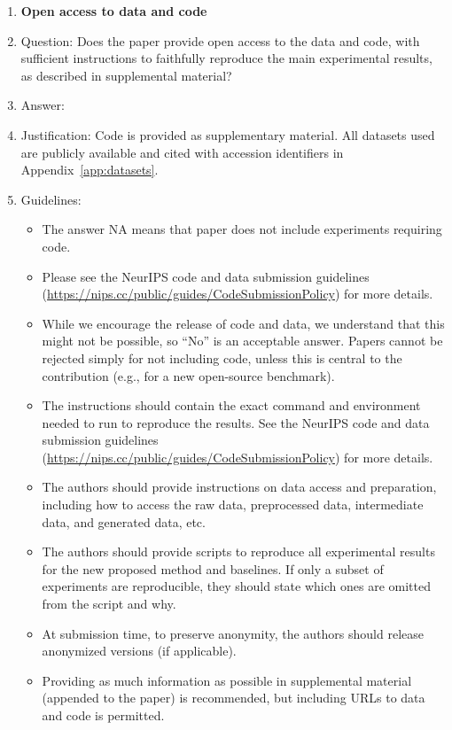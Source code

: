 \documentclass{article}
\theoremstyle{plain}
\theoremstyle{definition}
\begin{document}
\begin{enumerate}
  \item {\bf Open access to data and code}
  \item[] Question: Does the paper provide open access to the data and code, with sufficient instructions to faithfully reproduce the main experimental results, as described in supplemental material?
  \item[] Answer: \answerYes{}
  \item[] Justification: Code is provided as supplementary material. All datasets used are publicly available and cited with accession identifiers in Appendix~\ref{app:datasets}.
  \item[] Guidelines:
    \begin{itemize}
      \item The answer NA means that paper does not include experiments requiring code.
      \item Please see the NeurIPS code and data submission guidelines (\url{https://nips.cc/public/guides/CodeSubmissionPolicy}) for more details.
      \item While we encourage the release of code and data, we understand that this might not be possible, so “No” is an acceptable answer. Papers cannot be rejected simply for not including code, unless this is central to the contribution (e.g., for a new open-source benchmark).
      \item The instructions should contain the exact command and environment needed to run to reproduce the results. See the NeurIPS code and data submission guidelines (\url{https://nips.cc/public/guides/CodeSubmissionPolicy}) for more details.
      \item The authors should provide instructions on data access and preparation, including how to access the raw data, preprocessed data, intermediate data, and generated data, etc.
      \item The authors should provide scripts to reproduce all experimental results for the new proposed method and baselines. If only a subset of experiments are reproducible, they should state which ones are omitted from the script and why.
      \item At submission time, to preserve anonymity, the authors should release anonymized versions (if applicable).
      \item Providing as much information as possible in supplemental material (appended to the paper) is recommended, but including URLs to data and code is permitted.
    \end{itemize}


\end{enumerate}
\end{document}

